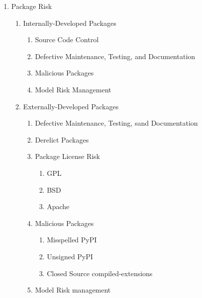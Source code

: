 \begin{enumerate}
        \item Package Risk
        \begin{enumerate}
                \item Internally-Developed Packages
                \begin{enumerate}
                        \item Source Code Control
                        \item Defective Maintenance, Testing, and Documentation
                        \item Malicious Packages
                        \item Model Risk Management
                \end{enumerate}
                \item Externally-Developed Packages
                \begin{enumerate}
                        \item Defective Maintenance, Testing, sand Documentation
                        \item Derelict Packages
                        \item Package License Risk
                        \begin{enumerate}
                                \item GPL
                                \item BSD
                                \item Apache
                        \end{enumerate}
                        \item Malicious Packages
                        \begin{enumerate}
                                \item Misspelled PyPI
                                \item Unsigned PyPI
                                \item Closed Source compiled-extensions
                        \end{enumerate}
                        \item Model Risk management
                \end{enumerate}
        \end{enumerate} %


\end{enumerate}
